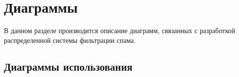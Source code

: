 \chapter{Диаграммы}
\label{cha:design}

В данном разделе производится описание диаграмм, связанных с разработкой распределенной системы фильтрации спама.

\section{Диаграммы использования}
% 
% 
% 
% 
% 
% 




